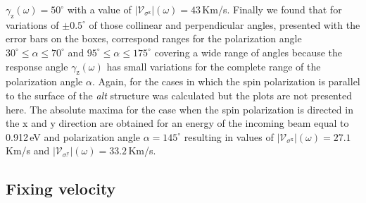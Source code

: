 \documentclass[prb,11pt,tightenlines,twocolumn,aps]{revtex4-1}
\begin{document}
$\gamma_{\mathrm{z}}(\omega)=50^{\circ}$ with a value of
$|\mathcal{V}_{\sigma^{\mathrm{z}}}|(\omega)=43$\,Km/s. Finally we found that
for variations of $\pm0.5^{\circ}$ of those collinear and perpendicular angles,
presented with the error bars on the boxes, correspond ranges for the
polarization angle $30^{\circ} \leq \alpha \leq 70^{\circ}$ and $95^{\circ} \leq
\alpha \leq 175^{\circ}$ covering a wide range of angles because the response
angle $\gamma_{\mathrm{z}}(\omega)$ has small variations for the complete range
of the polarization angle $\alpha$.
% 
Again, for the cases in which the spin polarization is parallel to the surface
of the \emph{alt} structure was calculated but the plots are not presented here.
The absolute maxima for the case when the spin polarization is directed in the
$\mathrm{x}$ and $\mathrm{y}$ direction are obtained for an energy of the
incoming beam equal to 0.912\,eV and polarization angle $\alpha=145^{\circ}$
resulting in values of $|\mathcal{V}_{\sigma^{\mathrm{x}}}|(\omega)=27.1$\,Km/s
and $|\mathcal{V}_{\sigma^{\mathrm{y}}}|(\omega)=33.2$\,Km/s.



\subsection{Fixing velocity} %
\label{sec:res-fixvel}


\end{document}
